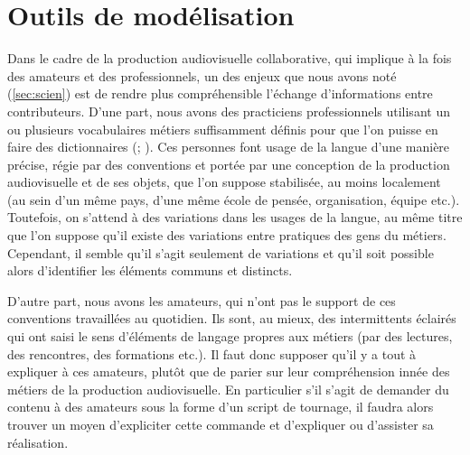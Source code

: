 \chapter{Outils de modélisation}\label{chap:omod}
\minitoc


Dans le cadre de la production audiovisuelle collaborative, qui implique à la fois des amateurs et des professionnels, un des enjeux que nous avons noté (\ref{sec:scien}) est de rendre plus compréhensible l'échange d'informations entre contributeurs. 
D'une part, nous avons des practiciens professionnels utilisant un ou plusieurs vocabulaires métiers suffisamment définis pour que l'on puisse en faire des dictionnaires (\cite{Journot2008}; \cite{Pinel2008}). 
Ces personnes font usage de la langue d'une manière précise, régie par des conventions et portée par une conception de la production audiovisuelle et de ses objets, que l'on suppose stabilisée, au moins localement (au sein d'un même pays, d'une même école de pensée, organisation, équipe etc.).
Toutefois, on s'attend à des variations dans les usages de la langue, au même titre que l'on suppose qu'il existe des variations entre pratiques des gens du métiers.
Cependant, il semble qu'il s'agit seulement de variations et qu'il soit possible alors d'identifier les éléments communs et distincts.

D'autre part, nous avons les amateurs, qui n'ont pas le support de ces conventions travaillées au quotidien.
Ils sont, au mieux, des intermittents éclairés qui ont saisi le sens d'éléments de langage propres aux métiers (par des lectures, des rencontres, des formations etc.). 
Il faut donc supposer qu'il y a tout à expliquer à ces amateurs, plutôt que de parier sur leur compréhension innée des métiers de la production audiovisuelle.
En particulier s'il s'agit de demander du contenu à des amateurs sous la forme d'un script de tournage, il faudra alors trouver un moyen d'expliciter cette commande et d'expliquer ou d'assister sa réalisation. 

